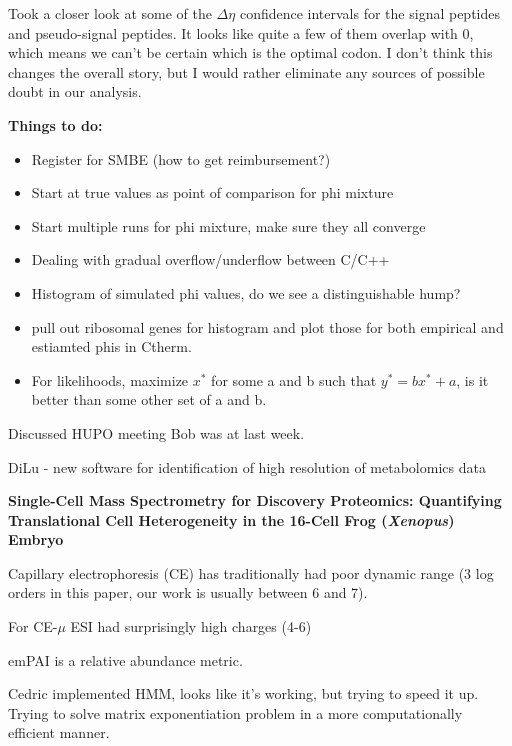 \documentclass[11pt]{labbook}
\begin{document}
Took a closer look at some of the $\Delta\eta$ confidence intervals for the signal peptides and pseudo-signal peptides. It looks like quite a few of them overlap with 0, which means we can't be certain which is the optimal codon. I don't think this changes the overall story, but I would rather eliminate any sources of possible doubt in our analysis. 


\textbf{Things to do:}
\begin{itemize}
	\item Register for SMBE (how to get reimbursement?)	
	\item Start at true values as point of comparison for phi mixture
	\item Start multiple runs for phi mixture, make sure they all converge  
	\item Dealing with gradual overflow/underflow between C/C++
	\item Histogram of simulated phi values, do we see a distinguishable hump?
	\item pull out ribosomal genes for histogram and plot those for both empirical and estiamted phis in Ctherm.
	\item For likelihoods, maximize $x^*$ for some a and b such that $y^* = bx^* + a$, is it better than some other set of a and b.
\end{itemize} 

Discussed HUPO meeting Bob was at last week. 

DiLu - new software for identification of high resolution of metabolomics data \newline

\textbf{Single-Cell Mass Spectrometry for Discovery Proteomics: Quantifying Translational Cell Heterogeneity in the 16-Cell Frog (\textit{Xenopus}) Embryo}\newline

Capillary electrophoresis (CE) has traditionally had poor dynamic range (3 log orders in this paper, our work is usually between 6 and 7). 

For CE-$\mu$ ESI had surprisingly high charges (4-6)

emPAI is a relative abundance metric.  

Cedric implemented HMM, looks like it's working, but trying to speed it up. Trying to solve matrix exponentiation problem in a more computationally efficient manner. 
\end{document}
